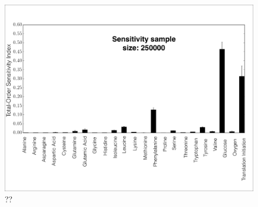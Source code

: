 \documentclass[12pt]{article}
\begin{document}
\begin{figure}[ht]
\centering
\includegraphics[width=1.00\textwidth]{./Figures/Gln_GlobalSensitivity.pdf}
\caption{??}
\label{fig:Glutamine_GlobalSensitivityAnalysis}
\end{figure}


\clearpage

\renewcommand\thefigure{S\arabic{figure}}
\renewcommand\thetable{T\arabic{table}}
\renewcommand\thepage{S-\arabic{page}}
\renewcommand\theequation{S\arabic{equation}}

\setcounter{equation}{0}
\setcounter{table}{0}
\setcounter{figure}{0}
\setcounter{page}{1}


\end{document}
